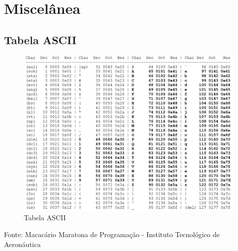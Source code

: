 \newpage
\section{Miscelânea}
\subsection{Tabela ASCII}
\begin{figure}[H]
    \caption{Tabela ASCII} 
    \vspace{0.5cm}
    \vspace{\belowcaptionskip}
    \centering
    \includegraphics[scale = 0.5]{image/ascii.jpg}
    \par\medskip
    \label{fig:ascii}
\end{figure}

\begin{center}
    Fonte: Macacário Maratona de Programação - Instituto Tecnológico de Aeronáutica
\end{center}